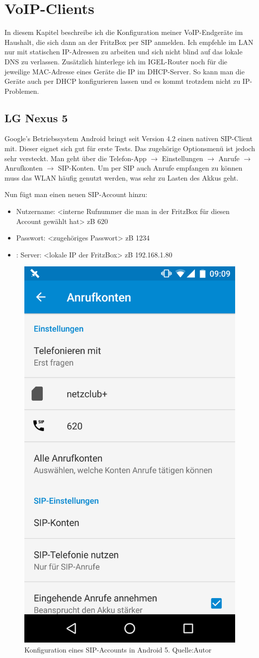 \documentclass[a4paper,12pt]{scrbook}
\begin{document}
\section{VoIP-Clients}
In diesem Kapitel beschreibe ich die Konfiguration meiner VoIP-Endgeräte im Haushalt, die sich dann an der FritzBox per SIP anmelden. Ich empfehle im LAN nur mit statischen
IP-Adressen zu arbeiten und sich nicht blind auf das lokale DNS zu verlassen. Zusätzlich hinterlege ich im IGEL-Router noch für die jeweilige MAC-Adresse eines Geräte die 
IP im DHCP-Server. So kann man die Geräte auch per DHCP konfigurieren lassen und es kommt trotzdem nicht zu IP-Problemen.

\subsection{LG Nexus 5}
Google's Betriebssystem Android bringt seit Version 4.2 einen nativen SIP-Client mit. Dieser eignet sich gut für erste Tests. Das zugehörige Optionsmenü ist jedoch sehr versteckt.
Man geht über die Telefon-App $\rightarrow$ Einstellungen $\rightarrow$ Anrufe $\rightarrow$ Anrufkonten $\rightarrow$ SIP-Konten. Um per SIP auch Anrufe empfangen zu können muss
das WLAN häufig genutzt werden, was sehr zu Lasten des Akkus geht.

Nun fügt man einen neuen SIP-Account hinzu:
\begin{itemize}
 \item Nutzername: <interne Rufnummer die man in der FritzBox für diesen Account gewählt hat> zB 620
 \item Passwort: <zugehöriges Passwort> zB 1234
 \item: Server: <lokale IP der FritzBox> zB 192.168.1.80
\end{itemize}

\begin{figure}[H]
\begin{center}
\includegraphics[width=.4\hsize]{./images/voip-client-nexus5.png}
\end{center}
\caption[Konfiguration eines SIP-Accounts in Android 5]
{\label{voip-client-nexus5}Konfiguration eines SIP-Accounts in Android 5. Quelle:Autor}
\end{figure}
\end{document}
